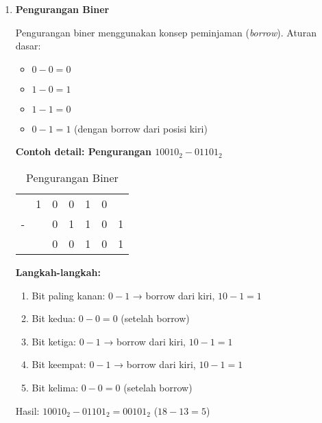 \documentclass[../main.tex]{subfiles}
\begin{document}
\begin{enumerate}
                \item \textbf{Pengurangan Biner}

                    Pengurangan biner menggunakan konsep peminjaman (\textit{borrow}). Aturan dasar:
                    \begin{itemize}
                        \item \(0 - 0 = 0\)
                        \item \(1 - 0 = 1\)
                        \item \(1 - 1 = 0\)
                        \item \(0 - 1 = 1\) (dengan borrow dari posisi kiri)
                    \end{itemize}

                    \textbf{Contoh detail: Pengurangan \(10010_2 - 01101_2\)}

                    \begin{table}[H]
                        \centering
                        \caption{Pengurangan Biner}
                        \begin{tabular}{ccccccc}
                            & 1 & 0 & 0 & 1 & 0 & \\
                            - &   & 0 & 1 & 1 & 0 & 1 \\
                            \hline
                            &   & 0 & 0 & 1 & 0 & 1 \\
                        \end{tabular}
                        \label{tab:binary-subtraction}
                    \end{table}

                    \textbf{Langkah-langkah:}
                    \begin{enumerate}
                        \item Bit paling kanan: \(0 - 1\) → borrow dari kiri, \(10 - 1 = 1\)
                        \item Bit kedua: \(0 - 0 = 0\) (setelah borrow)
                        \item Bit ketiga: \(0 - 1\) → borrow dari kiri, \(10 - 1 = 1\)
                        \item Bit keempat: \(0 - 1\) → borrow dari kiri, \(10 - 1 = 1\)
                        \item Bit kelima: \(0 - 0 = 0\) (setelah borrow)
                    \end{enumerate}

                    Hasil: \(10010_2 - 01101_2 = 00101_2\) (\(18 - 13 = 5\))


\end{enumerate}
\end{document}
